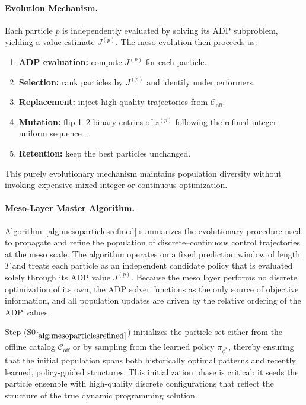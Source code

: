 \documentclass{article}
\newcommand{\1}{\mathds{1}}          %
\theoremstyle{definition}
\begin{document}
\begin{sloppypar}
\paragraph{Evolution Mechanism.}
Each particle $p$ is independently evaluated by solving its ADP subproblem, 
yielding a value estimate $J^{(p)}$.  
The meso evolution then proceeds as:
\begin{enumerate}
    \item[(i)] \textbf{ADP evaluation:} compute $J^{(p)}$ for each particle.
    \item[(ii)] \textbf{Selection:} rank particles by $J^{(p)}$ and identify underperformers.
    \item[(iii)] \textbf{Replacement:} inject high-quality trajectories from $\mathcal{C}_{\mathrm{off}}$.
    \item[(iv)] \textbf{Mutation:} flip 1--2 binary entries of $z^{(p)}$ 
              following the refined integer uniform sequence~\cite{MATRS}.
    \item[(v)] \textbf{Retention:} keep the best particles unchanged.
\end{enumerate}
This purely evolutionary mechanism maintains population diversity without invoking 
expensive mixed-integer or continuous optimization.

\paragraph{Meso-Layer Master Algorithm.}
Algorithm~\ref{alg:mesoparticlesrefined} summarizes the evolutionary procedure used to
propagate and refine the population of discrete--continuous control trajectories at the
meso scale.  
The algorithm operates on a fixed prediction window of length $T$ and treats each particle
as an independent candidate policy that is evaluated solely through its ADP value
$J^{(p)}$.  
Because the meso layer performs no discrete optimization of its own, the ADP solver
functions as the only source of objective information, and all population updates are driven
by the relative ordering of the ADP values.

Step (S0$_{\ref{alg:mesoparticlesrefined}}$) initializes the particle set either from the
offline catalog $\mathcal{C}_{\mathrm{off}}$ or by sampling from the learned policy
$\pi_{\phi^*}$, thereby ensuring that the initial population spans both historically optimal
patterns and recently learned, policy-guided structures.  
This initialization phase is critical: it seeds the particle ensemble with high-quality
discrete configurations that reflect the structure of the true dynamic programming solution.


\end{sloppypar}
\end{document}
